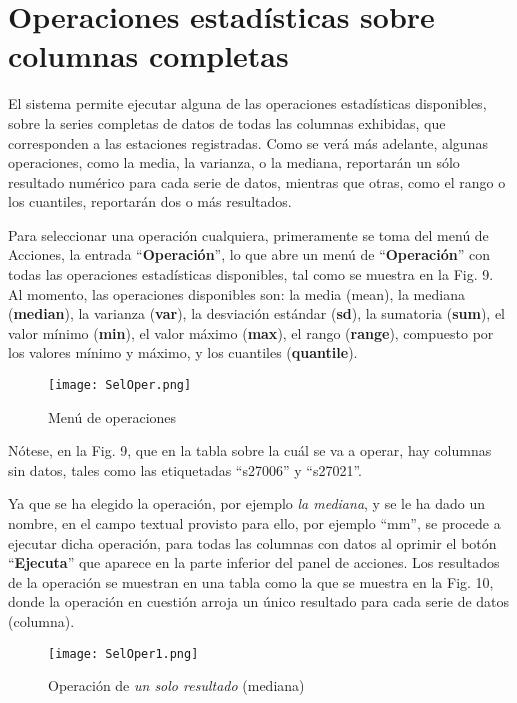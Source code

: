 \documentclass[spanish,]{article}
\begin{document}
\section{Operaciones estadísticas sobre columnas
completas}\label{operaciones-estadisticas-sobre-columnas-completas}

El sistema permite ejecutar alguna de las operaciones estadísticas
disponibles, sobre la series completas de datos de todas las columnas
exhibidas, que corresponden a las estaciones registradas. Como se verá
más adelante, algunas operaciones, como la media, la varianza, o la
mediana, reportarán un sólo resultado numérico para cada serie de datos,
mientras que otras, como el rango o los cuantiles, reportarán dos o más
resultados.

Para seleccionar una operación cualquiera, primeramente se toma del menú
de Acciones, la entrada ``\textbf{Operación}'', lo que abre un menú de
``\textbf{Operación}'' con todas las operaciones estadísticas
disponibles, tal como se muestra en la Fig. 9. Al momento, las
operaciones disponibles son: la media (mean), la mediana
(\textbf{median}), la varianza (\textbf{var}), la desviación estándar
(\textbf{sd}), la sumatoria (\textbf{sum}), el valor mínimo
(\textbf{min}), el valor máximo (\textbf{max}), el rango
(\textbf{range}), compuesto por los valores mínimo y máximo, y los
cuantiles (\textbf{quantile}).

\begin{figure}
\centering
\texttt{[image: SelOper.png]}
\caption{Menú de operaciones}
\end{figure}

Nótese, en la Fig. 9, que en la tabla sobre la cuál se va a operar, hay
columnas sin datos, tales como las etiquetadas ``s27006'' y ``s27021''.

Ya que se ha elegido la operación, por ejemplo \emph{la mediana}, y se
le ha dado un nombre, en el campo textual provisto para ello, por
ejemplo ``mm'', se procede a ejecutar dicha operación, para todas las
columnas con datos al oprimir el botón ``\textbf{Ejecuta}'' que aparece
en la parte inferior del panel de acciones. Los resultados de la
operación se muestran en una tabla como la que se muestra en la Fig. 10,
donde la operación en cuestión arroja un único resultado para cada serie
de datos (columna).

\begin{figure}
\centering
\texttt{[image: SelOper1.png]}
\caption{Operación de \emph{un solo resultado} (mediana)}
\end{figure}
\end{document}
